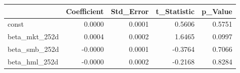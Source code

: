 \begin{tabular}{lrrrr}
\toprule
 & Coefficient & Std\_Error & t\_Statistic & p\_Value \\
\midrule
const & 0.0000 & 0.0001 & 0.5606 & 0.5751 \\
beta\_mkt\_252d & 0.0004 & 0.0002 & 1.6465 & 0.0997 \\
beta\_smb\_252d & -0.0000 & 0.0001 & -0.3764 & 0.7066 \\
beta\_hml\_252d & -0.0000 & 0.0002 & -0.2168 & 0.8284 \\
\bottomrule
\end{tabular}
